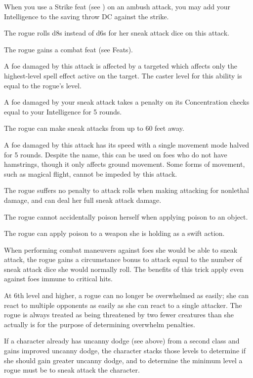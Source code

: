  When you use a Strike feat (see ) on an ambush attack, you may add your Intelligence to the saving throw DC against the strike.

 The rogue rolls d8s instead of d6s for her sneak attack dice on this attack.

 The rogue gains a combat feat (see Feats).

 A foe damaged by this attack is affected by a targeted  which affects only the highest-level spell effect active on the target. The caster level for this ability is equal to the rogue's level.

 A foe damaged by your sneak attack takes a penalty on its Concentration checks equal to your Intelligence for 5 rounds.

 The rogue can make sneak attacks from up to 60 feet away.

 A foe damaged by this attack has its speed with a single movement mode halved for 5 rounds. Despite the name, this can be used on foes who do not have hamstrings, though it only affects ground movement. Some forms of movement, such as magical flight, cannot be impeded by this attack.

 The rogue suffers no penalty to attack rolls when making attacking for nonlethal damage, and can deal her full sneak attack damage.

 The rogue cannot accidentally poison herself when applying poison to an object.

 The rogue can apply poison to a weapon she is holding as a swift action.

 When performing combat maneuvers against foes she would be able to sneak attack, the rogue gains a circumstance bonus to attack equal to the number of sneak attack dice she would normally roll. The benefits of this trick apply even against foes immune to critical hits.

 At 6th level and higher, a rogue can no longer be overwhelmed as easily; she can react to multiple opponents as easily as she can react to a single attacker. The rogue is always treated as being threatened by two fewer creatures than she actually is for the purpose of determining overwhelm penalties. 

\par If a character already has uncanny dodge (see above) from a second class and gains improved uncanny dodge, the character stacks those levels to determine if she should gain greater uncanny dodge, and to determine the minimum level a rogue must be to sneak attack the character.

